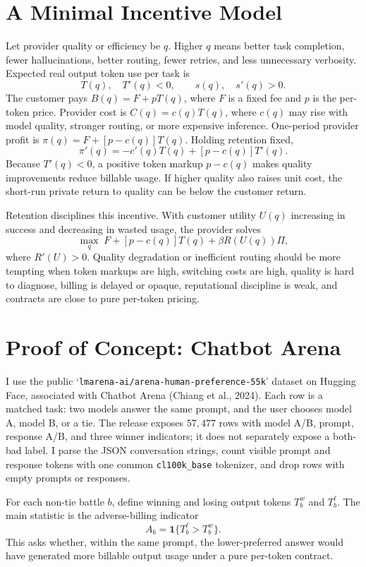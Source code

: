 \documentclass[10pt,twocolumn]{article}
\begin{document}
\section*{A Minimal Incentive Model}
Let provider quality or efficiency be \(q\). Higher \(q\) means better task completion, fewer hallucinations, better routing, fewer retries, and less unnecessary verbosity. Expected real output token use per task is
\[
T(q),\quad T'(q)<0,
\qquad
s(q),\quad s'(q)>0.
\]
The customer pays \(B(q)=F+pT(q)\), where \(F\) is a fixed fee and \(p\) is the per-token price. Provider cost is \(C(q)=c(q)T(q)\), where \(c(q)\) may rise with model quality, stronger routing, or more expensive inference. One-period provider profit is \(\pi(q)=F+[p-c(q)]T(q)\). Holding retention fixed,
\[
\pi'(q)=-c'(q)T(q)+[p-c(q)]T'(q).
\]
Because \(T'(q)<0\), a positive token markup \(p-c(q)\) makes quality improvements reduce billable usage. If higher quality also raises unit cost, the short-run private return to quality can be below the customer return.

Retention disciplines this incentive. With customer utility \(U(q)\) increasing in success and decreasing in wasted usage, the provider solves
\[
\max_q\; F+[p-c(q)]T(q)+\beta R(U(q))\Pi,
\]
where \(R'(U)>0\). Quality degradation or inefficient routing should be more tempting when token markups are high, switching costs are high, quality is hard to diagnose, billing is delayed or opaque, reputational discipline is weak, and contracts are close to pure per-token pricing.

\section*{Proof of Concept: Chatbot Arena}
I use the public `\texttt{lmarena-ai/arena-human-preference-55k}' dataset on Hugging Face, associated with Chatbot Arena (Chiang et al., 2024). Each row is a matched task: two models answer the same prompt, and the user chooses model A, model B, or a tie. The release exposes \(57{,}477\) rows with model A/B, prompt, response A/B, and three winner indicators; it does not separately expose a both-bad label. I parse the JSON conversation strings, count visible prompt and response tokens with one common \texttt{cl100k\_base} tokenizer, and drop rows with empty prompts or responses.

For each non-tie battle \(b\), define winning and losing output tokens \(T^w_b\) and \(T^\ell_b\). The main statistic is the adverse-billing indicator
\[
A_b=\mathbf{1}\{T^\ell_b>T^w_b\}.
\]
This asks whether, within the same prompt, the lower-preferred answer would have generated more billable output usage under a pure per-token contract.
\end{document}
